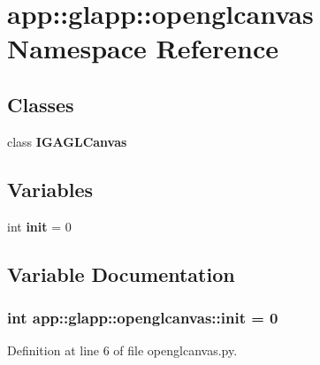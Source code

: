 \section{app::glapp::openglcanvas Namespace Reference}
\label{namespaceapp_1_1glapp_1_1openglcanvas}


\subsection*{Classes}
\begin{CompactItemize}
\item 
class {\bf IGAGLCanvas}
\end{CompactItemize}
\subsection*{Variables}
\begin{CompactItemize}
\item 
int {\bf init} = 0
\end{CompactItemize}


\subsection{Variable Documentation}
\subsubsection{\setlength{\rightskip}{0pt plus 5cm}int {\bf app::glapp::openglcanvas::init} = 0\hspace{0.3cm}{\tt  [static]}}\label{namespaceapp_1_1glapp_1_1openglcanvas_d1d7287730e0f428a13e2405b99e3660}




Definition at line 6 of file openglcanvas.py.